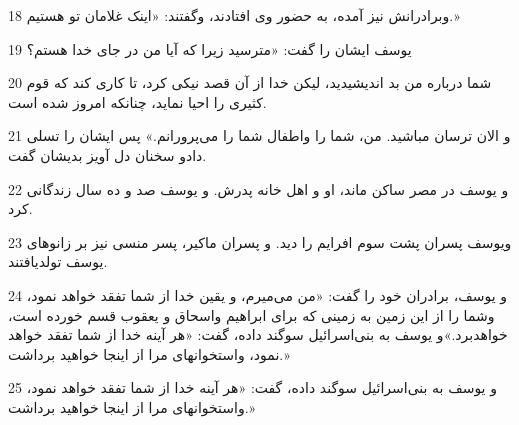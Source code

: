 \par 18 وبرادرانش نیز آمده، به حضور وی افتادند، وگفتند: «اینک غلامان تو هستیم.»
\par 19 یوسف ایشان را گفت: «مترسید زیرا که آیا من در جای خدا هستم؟
\par 20 شما درباره من بد اندیشیدید، لیکن خدا از آن قصد نیکی کرد، تا کاری کند که قوم کثیری را احیا نماید، چنانکه امروز شده است.
\par 21 و الان ترسان مباشید. من، شما را واطفال شما را می‌پرورانم.» پس ایشان را تسلی دادو سخنان دل آویز بدیشان گفت.
\par 22 و یوسف در مصر ساکن ماند، او و اهل خانه پدرش. و یوسف صد و ده سال زندگانی کرد.
\par 23 ویوسف پسران پشت سوم افرایم را دید. و پسران ماکیر، پسر منسی نیز بر زانوهای یوسف تولدیافتند.
\par 24 و یوسف، برادران خود را گفت: «من می‌میرم، و یقین خدا از شما تفقد خواهد نمود، وشما را از این زمین به زمینی که برای ابراهیم واسحاق و یعقوب قسم خورده است، خواهدبرد.»و یوسف به بنی‌اسرائیل سوگند داده، گفت: «هر آینه خدا از شما تفقد خواهد نمود، واستخوانهای مرا از اینجا خواهید برداشت.»
\par 25 و یوسف به بنی‌اسرائیل سوگند داده، گفت: «هر آینه خدا از شما تفقد خواهد نمود، واستخوانهای مرا از اینجا خواهید برداشت.»



